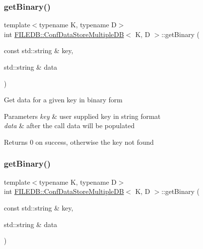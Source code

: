\subsubsection{\texorpdfstring{getBinary()}{getBinary()}\hspace{0.1cm}{\footnotesize\ttfamily [1/3]}}
{\footnotesize\ttfamily template$<$typename K, typename D$>$ \\
int \mbox{\hyperlink{classFILEDB_1_1ConfDataStoreMultipleDB}{F\+I\+L\+E\+D\+B\+::\+Conf\+Data\+Store\+Multiple\+DB}}$<$ K, D $>$\+::get\+Binary (\begin{DoxyParamCaption}\item[{const std\+::string \&}]{key,  }\item[{std\+::string \&}]{data }\end{DoxyParamCaption})\hspace{0.3cm}{\ttfamily [inline]}}

Get data for a given key in binary form


\begin{DoxyParams}{Parameters}
{\em key} & user supplied key in string format \\
\hline
{\em data} & after the call data will be populated \\
\hline
\end{DoxyParams}
\begin{DoxyReturn}{Returns}
0 on success, otherwise the key not found 
\end{DoxyReturn}
\mbox{\label{classFILEDB_1_1ConfDataStoreMultipleDB_a56fefab208c1b4abc3139afb38035a13}} 
\subsubsection{\texorpdfstring{getBinary()}{getBinary()}\hspace{0.1cm}{\footnotesize\ttfamily [2/3]}}
{\footnotesize\ttfamily template$<$typename K, typename D$>$ \\
int \mbox{\hyperlink{classFILEDB_1_1ConfDataStoreMultipleDB}{F\+I\+L\+E\+D\+B\+::\+Conf\+Data\+Store\+Multiple\+DB}}$<$ K, D $>$\+::get\+Binary (\begin{DoxyParamCaption}\item[{const std\+::string \&}]{key,  }\item[{std\+::string \&}]{data }\end{DoxyParamCaption})\hspace{0.3cm}{\ttfamily [inline]}}

